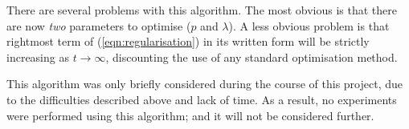 There are several problems with this algorithm.  The most obvious is that
there are now \emph{two} parameters to optimise ($p$ and $\lambda$).
A less obvious problem is that rightmost term of
(\ref{eqn:regularisation}) in its written form will be strictly
increasing as $t \rightarrow \infty$, discounting the use of any
standard optimisation method.

This algorithm was only briefly considered during the course of this
project, due to the difficulties described above and lack of time.  As
a result, no experiments were performed using this algorithm; and it
will not be considered further.




